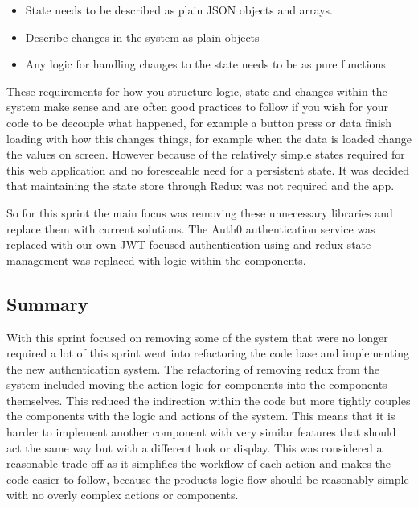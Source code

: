 \begin{itemize}
\item State needs to be described as plain JSON objects and arrays.
\item Describe changes in the system as plain objects
\item Any logic for handling changes to the state needs to be as pure functions
\end{itemize}

These requirements for how you structure logic, state and changes within the system make sense and are often good practices to follow if you wish for your code to be decouple what happened, for example a button press or data finish loading with how this changes things, for example when the data is loaded change the values on screen. However because of the relatively simple states required for this web application and no foreseeable need for a persistent state. It was decided that maintaining the state store through Redux was not required and the app.

So for this sprint the main focus was removing these unnecessary libraries and replace them with current solutions. The Auth0 authentication service was replaced with our own JWT focused authentication using and redux state management was replaced with logic within the components.

\subsection{Summary}
With this sprint focused on removing some of the system that were no longer required a lot of this sprint went into refactoring the code base and implementing the new authentication system. The refactoring of removing redux from the system included moving the action logic for components into the components themselves. This reduced the indirection within the code but more tightly couples the components with the logic and actions of the system. This means that it is harder to implement another component with very similar features that should act the same way but with a different look or display. This was considered a reasonable trade off as it simplifies the workflow of each action and makes the code easier to follow, because the products logic flow should be reasonably simple with no overly complex actions or components.


